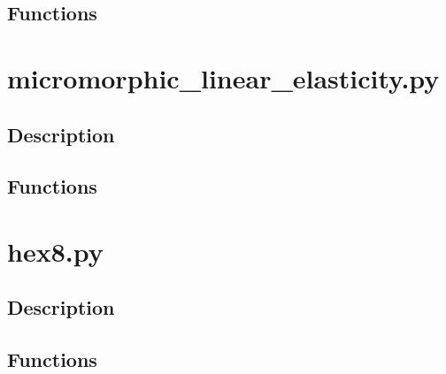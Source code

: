\documentclass{asme2ej}
\begin{document}
\subsection{Functions}

\section{micromorphic\_linear\_elasticity.py}

\subsection{Description}

\subsection{Functions}

\section{hex8.py}

\subsection{Description}

\subsection{Functions}

\FloatBarrier



\end{document}
